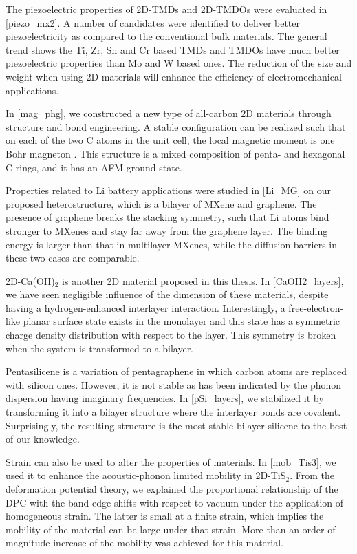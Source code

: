 The piezoelectric properties of 2D-TMDs and 2D-TMDOs were evaluated in \autoref{piezo_mx2}. A number of candidates were identified to deliver better piezoelectricity as compared to the conventional bulk materials. The general trend shows the Ti,  Zr, Sn and Cr based TMDs and TMDOs have much better piezoelectric properties than Mo and W based ones. The reduction of the size and weight when using 2D materials will enhance the efficiency of electromechanical applications.

In \autoref{mag_phg}, we constructed a new type of all-carbon 2D materials through structure and bond engineering. A stable configuration can be realized such that on each of the two C atoms in the unit cell, the local magnetic moment is one Bohr magneton . This structure is a mixed composition of penta- and hexagonal C rings, and it has an AFM ground state.

Properties related to Li battery applications were studied in \autoref{Li_MG} on our proposed heterostructure, which is a bilayer of MXene and graphene. The presence of graphene breaks the stacking symmetry, such that Li atoms bind stronger to MXenes and stay far away from the graphene layer. The binding energy is larger than that in multilayer MXenes, while the diffusion barriers in these two cases are comparable. 

2D-Ca(OH)$_2$ is another 2D material proposed in this thesis. In \autoref{CaOH2_layers}, we have seen negligible influence of the dimension of these materials, despite having a hydrogen-enhanced interlayer interaction. Interestingly, a free-electron-like planar surface state exists in the monolayer and this state has a symmetric charge density distribution with respect to the layer. This symmetry is broken when the system is transformed to a bilayer.

Pentasilicene is a variation of pentagraphene in which carbon atoms are replaced with silicon ones. However, it is not stable as has been indicated by the phonon dispersion having imaginary frequencies. In \autoref{pSi_layers}, we stabilized it by transforming it into a bilayer structure where the interlayer bonds are covalent. Surprisingly, the resulting structure is the most stable bilayer silicene to the best of our knowledge.

Strain can also be used to alter the properties of materials. In \autoref{mob_Tis3}, we used it to enhance the acoustic-phonon limited mobility in 2D-TiS$_2$. From the deformation potential theory, we explained the proportional relationship of the DPC with the band edge shifts with respect to vacuum under the application of homogeneous strain. The latter is small at a finite strain, which implies the mobility of the material can be large under that strain. More than an order of magnitude increase of the mobility was achieved for this material.

